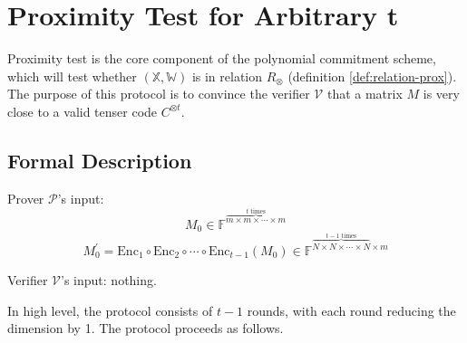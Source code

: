 \section{Proximity Test for Arbitrary t}

Proximity test is the core component of the polynomial commitment scheme, which will test whether $(\mathbb{X}, \mathbb{W})$ is in relation $R_\otimes$ (definition \ref{def:relation-prox}). The purpose of this protocol is to convince the verifier $\mathcal{V}$ that a matrix $M$ is very close to a valid tenser code $C^{\otimes t}$.

\subsection{Formal Description}

Prover $\mathcal{P}$'s input: 
$$
    M_0 \in \mathbb{F}^{\overbrace{m \times m \times \cdots \times m}^{t \text{ times}}}
$$
$$
    M_0^{\prime} = \text{Enc}_1 \circ \text{Enc}_2 \circ \cdots \circ \text{Enc}_{t-1}(M_0) \in \mathbb{F}^{\overbrace{N \times N \times \cdots \times N}^{t-1 \text{ times}} \times m}
$$

Verifier $\mathcal{V}$'s input: nothing.

In high level, the protocol consists of $t-1$ rounds, with each round reducing the dimension by 1. The protocol proceeds as follows. 

